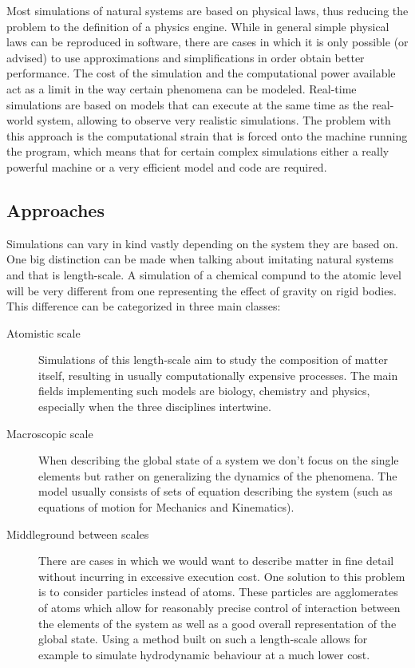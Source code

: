 \documentclass[]{usiinfbachelorproject}
\begin{document}
Most simulations of natural systems are based on physical laws, thus reducing the problem 
to the definition of a physics engine. While in general simple physical laws can be reproduced 
in software, there are cases in which it is only possible (or advised) to use approximations and 
simplifications in order obtain better performance. The cost of the simulation and the computational 
power available act as a limit in the way certain phenomena can be modeled. Real-time simulations 
are based on models that can execute at the same time as the real-world system, allowing to observe very 
realistic simulations. The problem with this approach is the computational strain that is forced onto 
the machine running the program, which means that for certain complex simulations either a really powerful 
machine or a very efficient model and code are required.

\subsection{Approaches} \label{Approaches}
Simulations can vary in kind vastly depending on the system they are based on. One big distinction 
can be made when talking about imitating natural systems and that is length-scale. A simulation of a 
chemical compund to the atomic level will be very different from one representing the effect of gravity 
on rigid bodies. This difference can be categorized in three main classes:

\begin{description}
    \item[Atomistic scale] Simulations of this length-scale aim to study the 
    composition of matter itself, resulting in usually computationally expensive processes.
    The main fields implementing such models are biology, chemistry and physics, especially when the 
    three disciplines intertwine.
    \item[Macroscopic scale] When describing the global state of a system we don't focus 
    on the single elements but rather on generalizing the dynamics of the phenomena. The model 
    usually consists of sets of equation describing the system (such as equations of motion for Mechanics and Kinematics).
    \item[Middleground between scales] There are cases in which we would want to describe matter in fine 
    detail without incurring in excessive execution cost. One solution to this problem is to consider particles instead of atoms.
    These particles are agglomerates of atoms which allow for reasonably precise control of interaction between 
    the elements of the system as well as a good overall representation of the global state. Using a method built 
    on such a length-scale allows for example to simulate hydrodynamic behaviour at a much lower cost.
\end{description}
\end{document}
